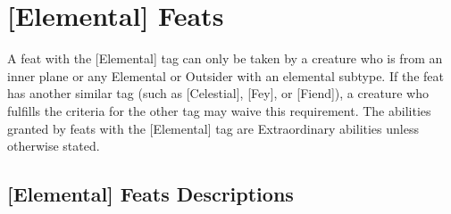 \section{[Elemental] Feats}

A feat with the [Elemental] tag can only be taken by a creature who is from an inner plane or any Elemental or Outsider with
an elemental subtype. If the feat has another similar tag (such as [Celestial], [Fey], or [Fiend]), a creature who fulfills the criteria for
the other tag may waive this requirement. The abilities granted by feats with the [Elemental] tag are Extraordinary abilities unless
otherwise stated.
\vspace*{\baselineskip}

\subsection{[Elemental] Feats Descriptions}




























